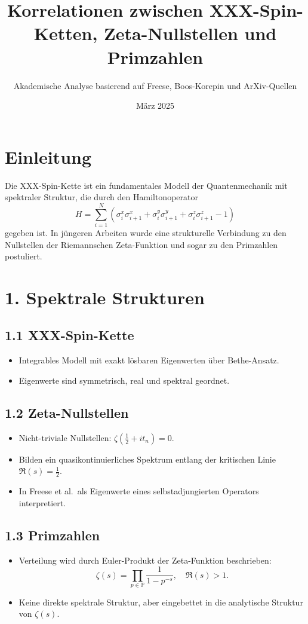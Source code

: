 \documentclass[12pt]{article}
\title{Korrelationen zwischen XXX-Spin-Ketten, Zeta-Nullstellen und Primzahlen}
\author{Akademische Analyse basierend auf Freese, Boos-Korepin und ArXiv-Quellen}
\date{März 2025}
\begin{document}
\maketitle

\section*{Einleitung}
Die XXX-Spin-Kette ist ein fundamentales Modell der Quantenmechanik mit spektraler Struktur, die durch den Hamiltonoperator
\[
H = \sum_{i=1}^{N} \left( \sigma_i^x \sigma_{i+1}^x + \sigma_i^y \sigma_{i+1}^y + \sigma_i^z \sigma_{i+1}^z - 1 \right)
\]
gegeben ist. In jüngeren Arbeiten wurde eine strukturelle Verbindung zu den Nullstellen der Riemannschen Zeta-Funktion und sogar zu den Primzahlen postuliert.

\section*{1. Spektrale Strukturen}

\subsection*{1.1 XXX-Spin-Kette}
\begin{itemize}
  \item Integrables Modell mit exakt lösbaren Eigenwerten über Bethe-Ansatz.
  \item Eigenwerte sind symmetrisch, real und spektral geordnet.
\end{itemize}

\subsection*{1.2 Zeta-Nullstellen}
\begin{itemize}
  \item Nicht-triviale Nullstellen: \( \zeta\left(\frac{1}{2} + it_n \right) = 0 \).
  \item Bilden ein quasikontinuierliches Spektrum entlang der kritischen Linie \( \Re(s) = \frac{1}{2} \).
  \item In Freese et al.\ als Eigenwerte eines selbstadjungierten Operators interpretiert.
\end{itemize}

\subsection*{1.3 Primzahlen}
\begin{itemize}
  \item Verteilung wird durch Euler-Produkt der Zeta-Funktion beschrieben:
  \[
  \zeta(s) = \prod_{p \in \mathbb{P}} \frac{1}{1 - p^{-s}}, \quad \Re(s) > 1.
  \]
  \item Keine direkte spektrale Struktur, aber eingebettet in die analytische Struktur von \( \zeta(s) \).
\end{itemize}
\end{document}

